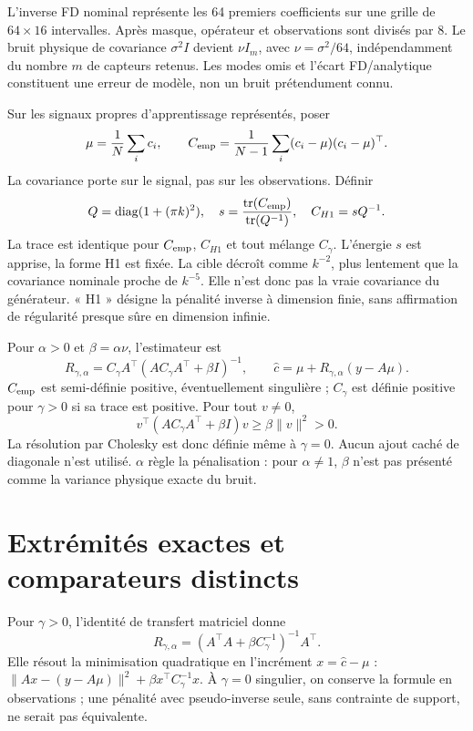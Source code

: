 \documentclass[11pt,a4paper]{article}
\begin{document}
L'inverse FD nominal représente les 64 premiers coefficients sur une grille de $64\times16$ intervalles. Après masque, opérateur et observations sont divisés par 8. Le bruit physique de covariance $\sigma^2I$ devient $\nu I_m$, avec $\nu=\sigma^2/64$, indépendamment du nombre $m$ de capteurs retenus. Les modes omis et l'écart FD/analytique constituent une erreur de modèle, non un bruit prétendument connu.

Sur les signaux propres d'apprentissage représentés, poser
\[
 \mu=\frac1N\sum_i c_i,\qquad
 C_{\rm emp}=\frac1{N-1}\sum_i(c_i-\mu)(c_i-\mu)^\top.
\]
La covariance porte sur le signal, pas sur les observations. Définir
\[
 Q=\operatorname{diag}(1+(\pi k)^2),\quad
 s=\frac{\operatorname{tr}(C_{\rm emp})}{\operatorname{tr}(Q^{-1})},\quad
 C_{H1}=sQ^{-1}.
\]
La trace est identique pour $C_{\rm emp}$, $C_{H1}$ et tout mélange $C_\gamma$. L'énergie $s$ est apprise, la forme H1 est fixée. La cible décroît comme $k^{-2}$, plus lentement que la covariance nominale proche de $k^{-5}$. Elle n'est donc pas la vraie covariance du générateur. « H1 » désigne la pénalité inverse à dimension finie, sans affirmation de régularité presque sûre en dimension infinie.

Pour $\alpha>0$ et $\beta=\alpha\nu$, l'estimateur est
\[
 R_{\gamma,\alpha}=C_\gamma A^\top(AC_\gamma A^\top+\beta I)^{-1},
 \qquad \widehat c=\mu+R_{\gamma,\alpha}(y-A\mu).
\]
$C_{\rm emp}$ est semi-définie positive, éventuellement singulière ; $C_\gamma$ est définie positive pour $\gamma>0$ si sa trace est positive. Pour tout $v\ne0$,
\[
 v^\top(AC_\gamma A^\top+\beta I)v\geq\beta\|v\|^2>0.
\]
La résolution par Cholesky est donc définie même à $\gamma=0$. Aucun ajout caché de diagonale n'est utilisé. $\alpha$ règle la pénalisation : pour $\alpha\ne1$, $\beta$ n'est pas présenté comme la variance physique exacte du bruit.

\newpage
\section{Extrémités exactes et comparateurs distincts}
Pour $\gamma>0$, l'identité de transfert matriciel donne
\[
 R_{\gamma,\alpha}=(A^\top A+\beta C_\gamma^{-1})^{-1}A^\top.
\]
Elle résout la minimisation quadratique en l'incrément $x=\widehat c-\mu$ : $\|Ax-(y-A\mu)\|^2+\beta x^\top C_\gamma^{-1}x$. À $\gamma=0$ singulier, on conserve la formule en observations ; une pénalité avec pseudo-inverse seule, sans contrainte de support, ne serait pas équivalente.
\end{document}

